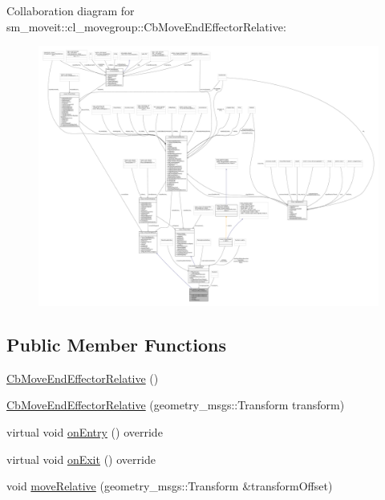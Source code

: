Collaboration diagram for sm\+\_\+moveit\+:\+:cl\+\_\+movegroup\+:\+:Cb\+Move\+End\+Effector\+Relative\+:
\nopagebreak
\begin{figure}[H]
\begin{center}
\leavevmode
\includegraphics[width=350pt]{classsm__moveit_1_1cl__movegroup_1_1CbMoveEndEffectorRelative__coll__graph}
\end{center}
\end{figure}
\subsection*{Public Member Functions}
\begin{DoxyCompactItemize}
\item 
\hyperlink{classsm__moveit_1_1cl__movegroup_1_1CbMoveEndEffectorRelative_a2fe80da8649d7e3e1e5d61c3532077fe}{Cb\+Move\+End\+Effector\+Relative} ()
\item 
\hyperlink{classsm__moveit_1_1cl__movegroup_1_1CbMoveEndEffectorRelative_af6bb26b3bee2afd5950cad6ebd5329c3}{Cb\+Move\+End\+Effector\+Relative} (geometry\+\_\+msgs\+::\+Transform transform)
\item 
virtual void \hyperlink{classsm__moveit_1_1cl__movegroup_1_1CbMoveEndEffectorRelative_a5d152b9b77890461260a803d3c31bb9d}{on\+Entry} () override
\item 
virtual void \hyperlink{classsm__moveit_1_1cl__movegroup_1_1CbMoveEndEffectorRelative_a20e788f5d5dab5b3d2899c6fcfd5c06a}{on\+Exit} () override
\item 
void \hyperlink{classsm__moveit_1_1cl__movegroup_1_1CbMoveEndEffectorRelative_af70aed79cb2a5c0b1b3d634113fdde3d}{move\+Relative} (geometry\+\_\+msgs\+::\+Transform \&transform\+Offset)
\end{DoxyCompactItemize}
